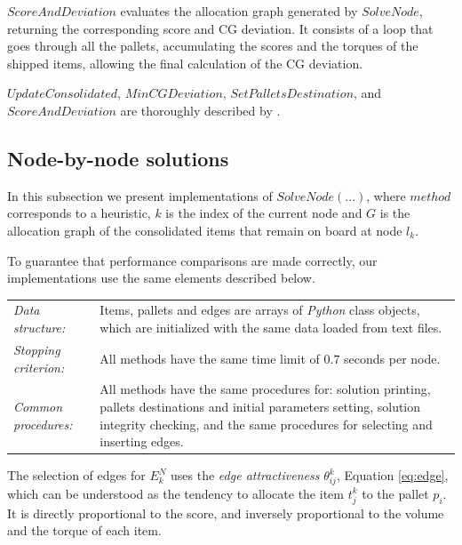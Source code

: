 \documentclass[preprint,authoryear]{elsarticle}
\begin{document}
$ScoreAndDeviation$ evaluates the allocation graph generated by $SolveNode$, returning the corresponding score and CG deviation. It consists of a loop that goes through all the pallets, accumulating the scores and the torques of the shipped items, allowing the final calculation of the CG deviation.

$UpdateConsolidated$, $MinCGDeviation$, $SetPalletsDestination$, and $ScoreAndDeviation$ are thoroughly described by \cite{MesquitaSanches2023}.


\subsection{Node-by-node solutions}
\label{methods}


In this subsection we present implementations of $SolveNode(...)$, where $method$\/ corresponds to a heuristic, $k$\/ is the index of the current node and $G$\/ is the allocation graph of the consolidated items that remain on board at node $l_k$.

To guarantee that performance comparisons are made correctly, our implementations use the same elements described below.


\bgroup
\def\arraystretch{1.2}
\begin{table}[H]
	\centering
	\small
	\begin{tabular}{CD}
		
		{\it Data structure:}     & Items, pallets and edges are arrays of \emph{Python} class objects, which are initialized with the same data loaded from text files. \\
		
		{\it Stopping criterion:} & All methods have the same time limit of $0.7$ seconds per node.\\
		
		{\it Common procedures:}  & All methods have the same procedures for: solution printing, pallets destinations and initial parameters setting, solution integrity checking, and the same procedures for selecting and inserting edges.\\

	\end{tabular}
	\normalsize
\end{table}
\egroup

The selection of edges for $E^N_k$\/ uses the {\it edge attractiveness}\/ $\theta^k_{ij}$, Equation \ref{eq:edge}, which can be understood as the tendency to allocate the item $t^k_j$\/ to the pallet $p_i$. It is directly proportional to the score, and inversely proportional to the volume and the torque of each item. 
\end{document}

